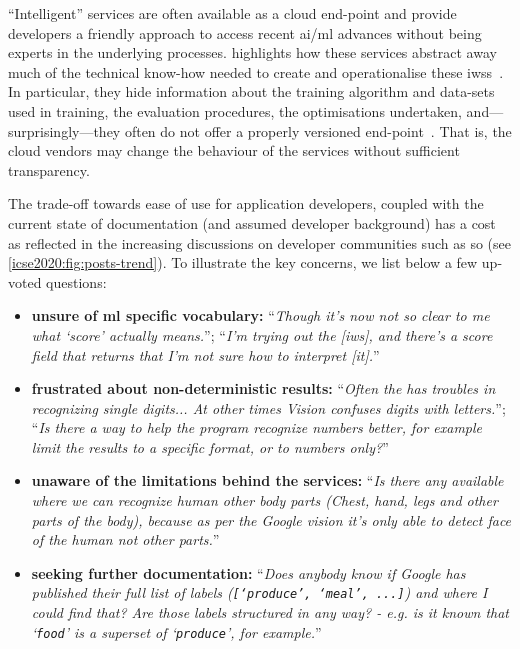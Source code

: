 ``Intelligent'' services are often available as a cloud end-point and provide developers a friendly approach to access recent \gls{ai}/\gls{ml} advances without being experts in the underlying processes.  highlights how these services abstract away much of the technical know-how needed to create and operationalise these \glspl{iws}~\citep{Ortiz:2017wg}. In particular, they hide information about the training algorithm and data-sets used in training, the evaluation procedures, the optimisations undertaken, and---surprisingly---they often do not offer a properly versioned end-point~\citep{Cummaudo:2019icsme, Ohtake:2019vi}. That is, the cloud vendors may change the behaviour of the services without sufficient transparency.

The trade-off towards ease of use for application developers, coupled with the current state of documentation (and assumed developer background) has a cost as reflected in the increasing discussions on developer communities such as \gls{so} (see \cref{icse2020:fig:posts-trend}). To illustrate the key concerns, we list below a few up-voted questions:

\begin{itemize}
  \item \textbf{unsure of \gls{ml} specific vocabulary:} ``\textit{Though it's now not \gls{so} clear to me what `score' actually means.}''; ``\textit{I'm trying out the [\gls{iws}], and there's a score field that returns that I'm not sure how to interpret [it].}''
  \item \textbf{frustrated about non-deterministic results:} ``\textit{Often the  has troubles in recognizing single digits... At other times Vision confuses digits with letters.}''; ``\textit{Is there a way to help the program recognize numbers better, for example limit the results to a specific format, or to numbers only?}''
  \item \textbf{unaware of the limitations behind the services:} ``\textit{Is there any  available where we can recognize human other body parts (Chest, hand, legs and other parts of the body), because as per the Google vision  it's only able to detect face of the human not other parts.}''
  \item \textbf{seeking further documentation:} ``\textit{Does anybody know if Google has published their full list of labels (\texttt{[`produce', `meal', ...]}) and where I could find that? Are those labels structured in any way? - e.g. is it known that `\texttt{food}' is a superset of `\texttt{produce}', for example.}''
\end{itemize}


